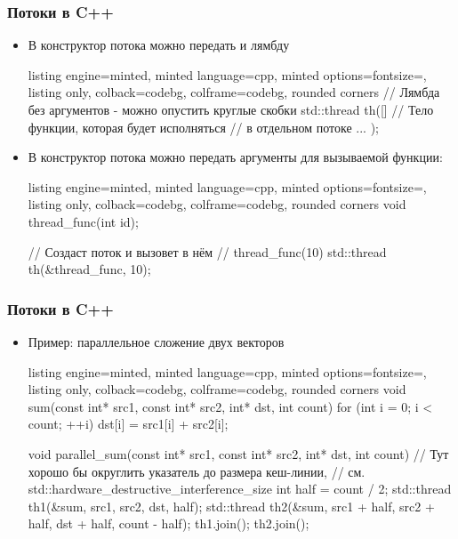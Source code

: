 \documentclass[10pt]{beamer}
\begin{document}
\begin{frame}[fragile]
\frametitle{Потоки в C++}
\begin{itemize}
\item В конструктор потока можно передать и лямбду
\begin{tcblisting}{listing engine=minted, minted language=cpp, minted options={fontsize=\scriptsize}, listing only, colback=codebg, colframe=codebg, rounded corners}
// Лямбда без аргументов - можно опустить круглые скобки
std::thread th([]{
  // Тело функции, которая будет исполняться
  // в отдельном потоке
  ...
});
\end{tcblisting}
\pause
{}
\item В конструктор потока можно передать аргументы для вызываемой функции:
\begin{tcblisting}{listing engine=minted, minted language=cpp, minted options={fontsize=\scriptsize}, listing only, colback=codebg, colframe=codebg, rounded corners}
void thread_func(int id);

// Создаст поток и вызовет в нём
// thread_func(10)
std::thread th(&thread_func, 10);
\end{tcblisting}
\end{itemize}
\end{frame}

\begin{frame}[fragile]
\frametitle{Потоки в C++}
\begin{itemize}
\item Пример: параллельное сложение двух векторов
\begin{tcblisting}{listing engine=minted, minted language=cpp, minted options={fontsize=\scriptsize}, listing only, colback=codebg, colframe=codebg, rounded corners}
void sum(const int* src1, const int* src2,
  int* dst, int count)
{
  for (int i = 0; i < count; ++i)
    dst[i] = src1[i] + src2[i];
}

void parallel_sum(const int* src1, const int* src2,
  int* dst, int count)
{
  // Тут хорошо бы округлить указатель до размера кеш-линии,
  // см. std::hardware_destructive_interference_size
  int half = count / 2;
  std::thread th1(&sum, src1, src2, dst, half);
  std::thread th2(&sum, src1 + half, src2 + half,
    dst + half, count - half);
  th1.join();
  th2.join();
}
\end{tcblisting}
\end{itemize}
\end{frame}
\end{document}
